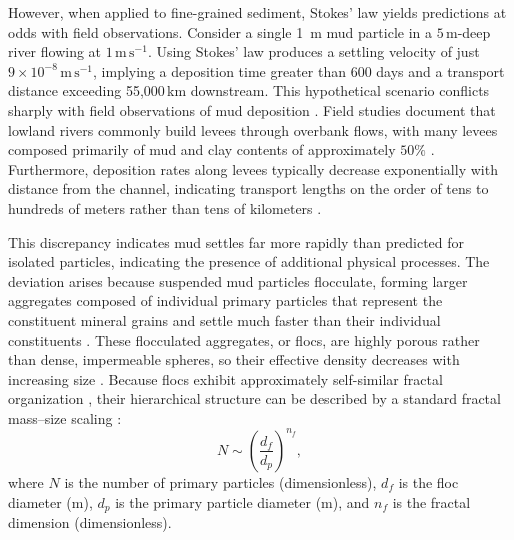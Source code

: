 \documentclass{agujournal2019}
\begin{document}
However, when applied to fine-grained sediment, Stokes' law yields predictions at odds with field observations. Consider a single 1~\textmu m mud particle in a $5$\,m-deep river flowing at $1\,\mathrm{m\,s}^{-1}$. Using Stokes’ law produces a settling velocity of just $9\times 10^{-8}\,\mathrm{m\,s}^{-1}$, implying a deposition time greater than 600 days and a transport distance exceeding 55,000\,km downstream. This hypothetical scenario conflicts sharply with field observations of mud deposition \cite{lamb2020mud, mason2019differential, nicholas1996significance}. Field studies document that lowland rivers commonly build levees through overbank flows, with many levees composed primarily of mud and clay contents of approximately $50\%$ \cite{aalto2008spatial}. Furthermore, deposition rates along levees typically decrease exponentially with distance from the channel, indicating transport lengths on the order of tens to hundreds of meters rather than tens of kilometers \cite{hajek2012simplified}.

This discrepancy indicates mud settles far more rapidly than predicted for isolated particles, indicating the presence of additional physical processes. The deviation arises because suspended mud particles flocculate, forming larger aggregates composed of individual primary particles that represent the constituent mineral grains and settle much faster than their individual constituents \cite{droppo1997freshwater, johnson1996settling, kranenburg1994fractal}. These flocculated aggregates, or flocs, are highly porous rather than dense, impermeable spheres, so their effective density decreases with increasing size \cite{kranenburg1994fractal, Meakin1992Aggregation}. Because flocs exhibit approximately self-similar fractal organization \cite{family2012kinetics, jullien1987aggregation}, their hierarchical structure can be described by a standard fractal mass–size scaling \cite{Meakin1992Aggregation}:
\begin{equation}
N \sim \left( \frac{d_f}{d_p} \right)^{n_f},
    \label{eq:fractaltheory}
\end{equation}
where $N$ is the number of primary particles (dimensionless), $d_f$ is the floc diameter (m), $d_p$ is the primary particle diameter (m), and $n_f$ is the fractal dimension (dimensionless).
\end{document}

